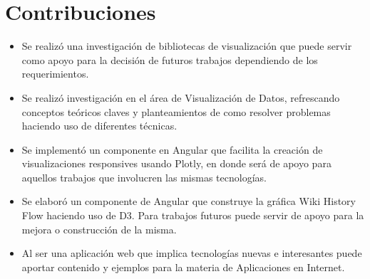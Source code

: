 \section{Contribuciones}
\begin{itemize}
    \item Se realizó una investigación de bibliotecas de visualización que puede servir como apoyo para la decisión de futuros trabajos dependiendo de los requerimientos.
    
    \item Se realizó investigación en el área de Visualización de Datos, refrescando conceptos teóricos claves y planteamientos de como resolver problemas haciendo uso de diferentes técnicas.
    
    \item Se implementó un componente en Angular que facilita la creación de visualizaciones responsives usando Plotly, en donde será de apoyo para aquellos trabajos que involucren las mismas tecnologías.
    
    \item Se elaboró un componente de Angular que construye la gráfica Wiki History Flow haciendo uso de D3. Para trabajos futuros puede servir de apoyo para la mejora o construcción de la misma.
    
    \item Al ser una aplicación web que implica tecnologías nuevas e interesantes puede aportar contenido y ejemplos para la materia de Aplicaciones en Internet.
\end{itemize}